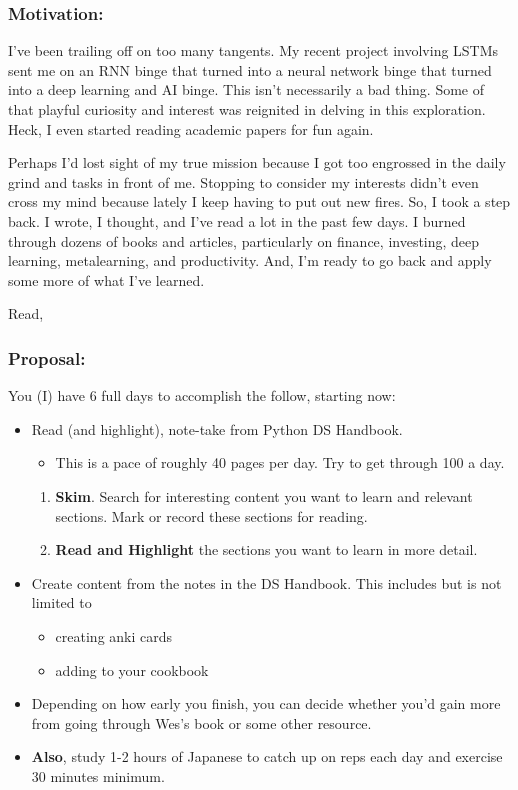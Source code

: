 \subsubsection*{Motivation:}
I've been trailing off on too many tangents. My recent project involving LSTMs sent me on an RNN binge that turned into a neural network binge that turned into a deep learning and AI binge. This isn't necessarily a bad thing. Some of that playful curiosity and interest was reignited in delving in this exploration. Heck, I even started reading academic papers for fun again.

Perhaps I'd lost sight of my true mission because I got too engrossed in the daily grind and tasks in front of me. Stopping to consider my interests didn't even cross my mind because lately I keep having to put out new fires. So, I took a step back. I wrote, I thought, and I've read  a lot in the past few days. I burned through dozens of books and articles, particularly on finance, investing, deep learning, metalearning, and productivity. And, I'm ready to go back and apply some more of what I've learned.

Read,

\subsubsection*{Proposal:}

You (I) have 6 full days to accomplish the follow, starting now:

\begin{itemize}
	\item
	Read (and highlight), note-take from Python DS Handbook.
	\begin{itemize}
		\item
		This is a pace of roughly 40 pages per day. Try to get through 100 a day.
	\end{itemize}
	\begin{enumerate}
		\item
		\textbf{Skim}. Search for interesting content you want to learn and relevant sections. Mark or record these sections for reading.
		\item
		\textbf{Read and Highlight} the sections you want to learn in more detail.
	\end{enumerate}
	\item
	Create content from the notes in the DS Handbook. This includes but is not limited to
	\begin{itemize}
		\item
		creating anki cards
		\item
		adding to your cookbook
	\end{itemize}

	\item
	Depending on how early you finish, you can decide whether you'd gain more from going through Wes's book or some other resource.
	\item
	\textbf{Also}, study 1-2 hours of Japanese to catch up on reps each day and exercise 30 minutes minimum.
\end{itemize}


